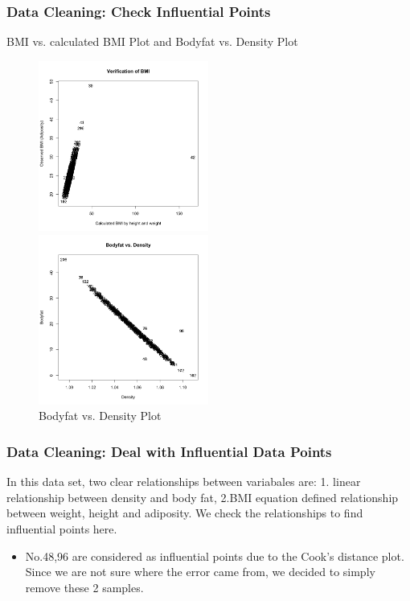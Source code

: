 \documentclass{beamer}
\begin{document}
\begin{frame}
\frametitle{Data Cleaning: Check Influential Points}

\begin{block}{BMI vs. calculated BMI Plot and Bodyfat vs. Density Plot}

\begin{figure}
\begin{minipage}[t]{0.5\linewidth}
\centering
\includegraphics[width=2.2in]{pic1.png}
\caption{BMI vs. calculated BMI Plot}
\label{fig:side:a}
\end{minipage}%
\begin{minipage}[t]{0.5\linewidth}
\centering
\includegraphics[width=2.2in]{pic2}
\caption{Bodyfat vs. Density Plot}
\label{fig:side:b}
\end{minipage}
\end{figure}

\end{block}
\end{frame}

\begin{frame}
\frametitle{Data Cleaning: Deal with Influential Data Points}
In this data set, two clear relationships between variabales are: 1. linear relationship between density and body fat, 2.BMI equation defined relationship between weight, height and adiposity. We check the relationships to find influential points here.
\begin{itemize}
\item No.48,96 are considered as influential points due to the Cook's distance plot. Since we are not sure where the error came from, we decided to simply remove these 2 samples.
\end{itemize}
\end{frame}
\end{document}
